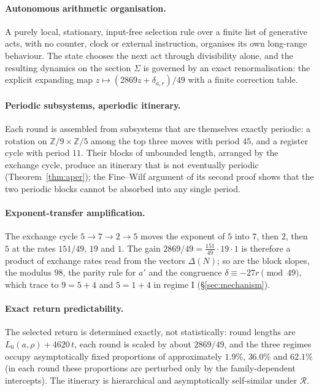 \documentclass[11pt,a4paper]{article}
\theoremstyle{definition}
\newcommand{\Sig}{\Sigma}
\newcommand{\Ret}{\mathcal{R}}
\begin{document}
\paragraph{Autonomous arithmetic organisation.} A purely local, stationary, input-free selection rule over a finite list of generative acts, with no counter, clock or external instruction, organises its own long-range behaviour. The state chooses the next act through divisibility alone, and the resulting dynamics on the section $\Sig$ is governed by an exact renormalisation: the explicit expanding map $z\mapsto(2869z+\delta_{a,r})/49$ with a finite correction table.

\paragraph{Periodic subsystems, aperiodic itinerary.} Each round is assembled from subsystems that are themselves exactly periodic: a rotation on $\mathbb{Z}/9\times\mathbb{Z}/5$ among the top three moves with period $45$, and a register cycle with period $11$. Their blocks of unbounded length, arranged by the exchange cycle, produce an itinerary that is not eventually periodic (Theorem~\ref{thm:aper}); the Fine--Wilf argument of its second proof shows that the two periodic blocks cannot be absorbed into any single period.

\paragraph{Exponent-transfer amplification.} The exchange cycle $5\to7\to2\to5$ moves the exponent of $5$ into $7$, then $2$, then $5$ at the rates $151/49$, $19$ and $1$. The gain $2869/49=\frac{151}{49}\cdot19\cdot1$ is therefore a product of exchange rates read from the vectors $\Delta(N)$; so are the block slopes, the modulus $98$, the parity rule for $a'$ and the congruence $\delta\equiv-27r\pmod{49}$, which trace to $9=5+4$ and $5=1+4$ in regime I (\S\ref{sec:mechanism}).

\paragraph{Exact return predictability.} The selected return is determined exactly, not statistically: round lengths are $L_0(a,\rho)+4620\,t$, each round is scaled by about $2869/49$, and the three regimes occupy asymptotically fixed proportions of approximately $1.9\%$, $36.0\%$ and $62.1\%$ (in each round these proportions are perturbed only by the family-dependent intercepts). The itinerary is hierarchical and asymptotically self-similar under $\Ret$.
\end{document}
